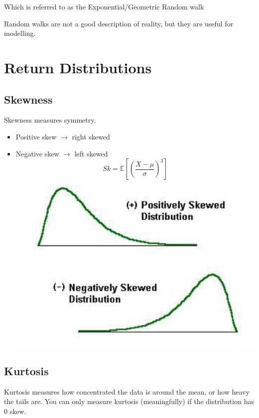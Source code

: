 \documentclass[
  oneside]{book}
\providecommand{\tightlist}{%
  \setlength{\itemsep}{0pt}\setlength{\parskip}{0pt}}
\begin{document}
Which is referred to as the Exponential/Geometric Random walk

Random walks are not a good description of reality, but they are useful for modelling.

\hypertarget{return-distributions}{%
\chapter{Return Distributions}\label{return-distributions}}

\hypertarget{skewness}{%
\section{Skewness}\label{skewness}}

Skewness measures symmetry.

\begin{itemize}
\tightlist
\item
  Positive skew \(\to\) right skewed
\item
  Negative skew \(\to\) left skewed
  \[
  Sk = \mathbb{E}\left[ \left( \frac{X-\mu}{\sigma} \right)^{3} \right]
  \]
  \includegraphics{Notes/Obsidian-Attachments/2-Return-Distributions.png}
\end{itemize}

\hypertarget{kurtosis}{%
\section{Kurtosis}\label{kurtosis}}

Kurtosis measures how concentrated the data is around the mean, or how heavy the tails are. You can only measure kurtosis (meaningfully) if the distribution has 0 skew.
\end{document}
